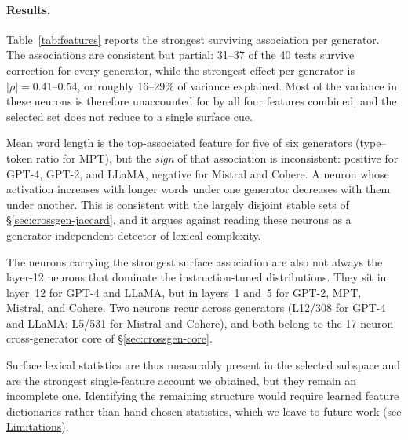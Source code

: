 \documentclass[11pt]{article}
\begin{document}
\paragraph{Results.}
Table~\ref{tab:features} reports the strongest surviving association per
generator. The associations are consistent but partial: 31--37 of the 40 tests
survive correction for every generator, while the strongest effect per
generator is $|\rho| = 0.41$--$0.54$, or roughly 16--29\% of variance
explained. Most of the variance in these neurons is therefore unaccounted for
by all four features combined, and the selected set does not reduce to a single
surface cue.

Mean word length is the top-associated feature for five of six generators
(type--token ratio for MPT), but the \textit{sign} of that association is
inconsistent: positive for GPT-4, GPT-2, and LLaMA, negative for Mistral and
Cohere. A neuron whose activation increases with longer words under one
generator decreases with them under another. This is consistent with the
largely disjoint stable sets of §\ref{sec:crossgen-jaccard}, and it argues
against reading these neurons as a generator-independent detector of lexical
complexity.

The neurons carrying the strongest surface association are also not always the
layer-12 neurons that dominate the instruction-tuned distributions. They sit in
layer~12 for GPT-4 and LLaMA, but in layers~1 and~5 for GPT-2, MPT, Mistral,
and Cohere. Two neurons recur across generators (L12/308 for GPT-4 and LLaMA;
L5/531 for Mistral and Cohere), and both belong to the 17-neuron
cross-generator core of §\ref{sec:crossgen-core}.

Surface lexical statistics are thus measurably present in the selected subspace
and are the strongest single-feature account we obtained, but they remain an
incomplete one. Identifying the remaining structure would require learned
feature dictionaries rather than hand-chosen statistics, which we leave to
future work (see \hyperref[sec:limitations]{Limitations}).
\end{document}

